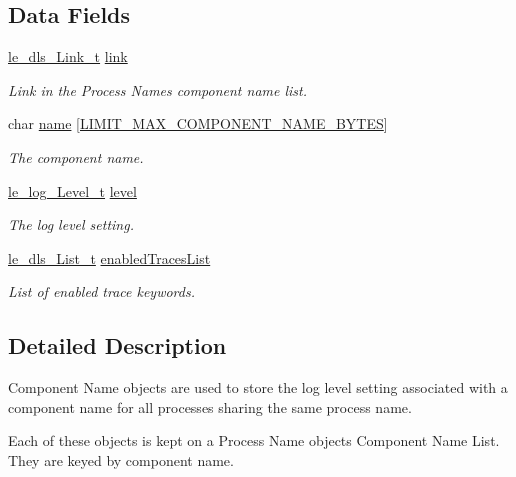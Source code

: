 \subsection*{Data Fields}
\begin{DoxyCompactItemize}
\item 
\hyperlink{structle__dls___link__t}{le\+\_\+dls\+\_\+\+Link\+\_\+t} \hyperlink{struct_component_name__t_a0102a124b5184654591b941ef69678f7}{link}
\begin{DoxyCompactList}\small\item\em Link in the Process Name\textquotesingle{}s component name list. \end{DoxyCompactList}\item 
char \hyperlink{struct_component_name__t_a71c2766ed4b343c509bafd6764621412}{name} \mbox{[}\hyperlink{limit_8h_ac7c88dede054bbe566dd6d064a9ddb82}{L\+I\+M\+I\+T\+\_\+\+M\+A\+X\+\_\+\+C\+O\+M\+P\+O\+N\+E\+N\+T\+\_\+\+N\+A\+M\+E\+\_\+\+B\+Y\+T\+ES}\mbox{]}
\begin{DoxyCompactList}\small\item\em The component name. \end{DoxyCompactList}\item 
\hyperlink{le__log_8h_aa3de78c088c398afb23c0b582deabc0a}{le\+\_\+log\+\_\+\+Level\+\_\+t} \hyperlink{struct_component_name__t_a1b15de9df7ba984abeab37507796b2e2}{level}
\begin{DoxyCompactList}\small\item\em The log level setting. \end{DoxyCompactList}\item 
\hyperlink{structle__dls___list__t}{le\+\_\+dls\+\_\+\+List\+\_\+t} \hyperlink{struct_component_name__t_abe19c50d5a16dd9d57cc5ea5e981b12f}{enabled\+Traces\+List}
\begin{DoxyCompactList}\small\item\em List of enabled trace keywords. \end{DoxyCompactList}\end{DoxyCompactItemize}


\subsection{Detailed Description}
Component Name objects are used to store the log level setting associated with a component name for all processes sharing the same process name.

Each of these objects is kept on a Process Name object\textquotesingle{}s Component Name List. They are keyed by component name. 

